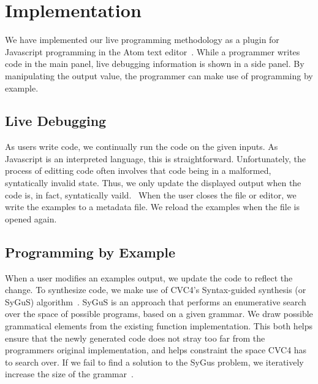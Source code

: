 \section{Implementation}
We have implemented our live programming methodology as a plugin
for Javascript programming in the Atom text editor~\cite{Atom}.
While a programmer writes code in the main panel,
live debugging information is shown in a side panel.
By manipulating the output value,
the programmer can make use of programming by example.

\subsection{Live Debugging}
As users write code, we continually run the code on the given inputs.
As Javascript is an interpreted language, this is straightforward.
Unfortunately, the process of editting code often involves that code
being in a malformed, syntatically invalid state.
Thus, we only update the displayed output when the code is, in fact,
syntatically vaild.~
When the user closes the file or editor,
we write the examples to a metadata file.
We reload the examples when the file is opened again.

\subsection{Programming by Example}
When a user modifies an examples output, we update the code to reflect the change.
To synthesize code, we make use of CVC4's Syntax-guided synthesis (or SyGuS) algorithm~\cite{reynolds2017sygus}.
SyGuS is an approach that performs an enumerative search over the space of possible programs,
based on a given grammar.
We draw possible grammatical elements from the existing function implementation.
This both helps ensure that the newly generated code does not stray too far from the programmers original implementation,
and helps constraint the space CVC4 has to search over.
If we fail to find a solution to the SyGus problem, we iteratively increase the size of the grammar~.
